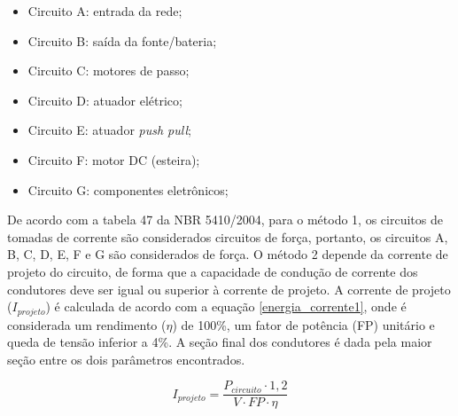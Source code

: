 \begin{itemize}
    \item Circuito A: entrada da rede;
    
    \item Circuito B: saída da fonte/bateria;
    
    \item Circuito C: motores de passo;
    
    \item Circuito D: atuador elétrico;
    
    \item Circuito E: atuador \textit{push pull};
    
    \item Circuito F: motor DC (esteira);
    
    \item Circuito G: componentes eletrônicos;
\end{itemize}

De acordo com a tabela 47 da NBR 5410/2004, para o método 1, os circuitos de tomadas de corrente são considerados circuitos de força, portanto, os circuitos A, B, C, D, E, F e G são considerados de força. O método 2 depende da corrente de projeto do circuito, de forma que a capacidade de condução de corrente dos condutores deve ser igual ou superior à corrente de projeto. A corrente de projeto ($I_{projeto}$) é calculada de acordo com a equação \ref{energia_corrente1}, onde é considerada um rendimento ($\eta$) de 100\%, um fator de potência (FP) unitário e queda de tensão inferior a 4\%. A seção final dos condutores é dada pela maior seção entre os dois parâmetros encontrados.
    
    \begin{equation}
        I_{projeto} = \frac{P_{circuito} \cdot 1,2}{V \cdot FP \cdot \eta}
        \label{energia_corrente1}
    \end{equation}

